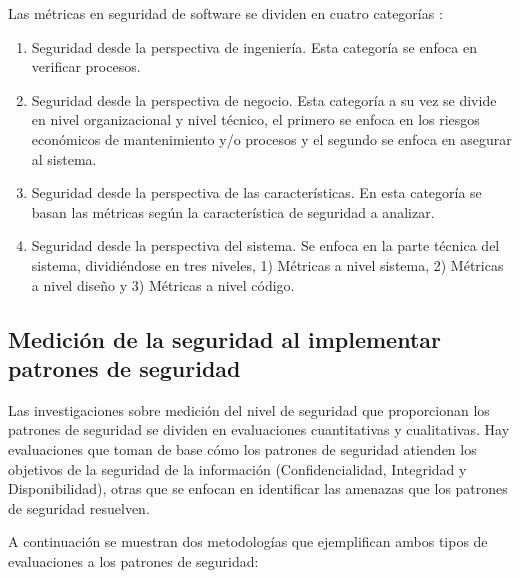 Las métricas en seguridad de software se dividen en cuatro categorías \cite{Saa1603}:

\begin{enumerate}[noitemsep]
	\item Seguridad desde la perspectiva de ingeniería. Esta categoría se enfoca en verificar procesos.
	\item Seguridad desde la perspectiva de negocio. Esta categoría a su vez se divide en nivel organizacional y nivel técnico, el primero se enfoca en los riesgos económicos de mantenimiento y/o procesos y el segundo se enfoca en asegurar al sistema. 
	\item Seguridad desde la perspectiva de las características. En esta categoría se basan las métricas según la característica de seguridad a analizar. 
	\item Seguridad desde la perspectiva del sistema. Se enfoca en la parte técnica del sistema, dividiéndose en tres niveles, 1) Métricas a nivel sistema, 2) Métricas a nivel diseño y 3) Métricas a nivel código.
\end{enumerate}


\subsection{Medición de la seguridad al implementar patrones de seguridad}

Las investigaciones sobre medición del nivel de seguridad que proporcionan los patrones de seguridad se dividen en evaluaciones cuantitativas y cualitativas. Hay evaluaciones que toman de base cómo los patrones de seguridad atienden los objetivos de la seguridad de la información (Confidencialidad, Integridad y Disponibilidad), otras que se enfocan en identificar las amenazas que los patrones de seguridad resuelven.

\vspace{0.3cm}

A continuación se muestran dos metodologías que ejemplifican ambos tipos de evaluaciones a los patrones de seguridad:

